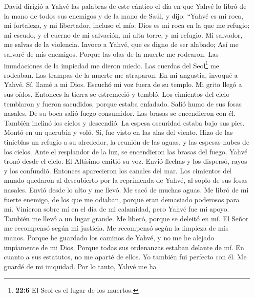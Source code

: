  David dirigió a Yahvé las palabras de este cántico el día
en que Yahvé lo libró de la mano de todos sus enemigos y de la mano de
Saúl,  y dijo: ``Yahvé es mi roca, mi fortaleza, y mi
libertador, incluso el mío;  Dios es mi roca en la que me
refugio; mi escudo, y el cuerno de mi salvación, mi alta torre, y mi
refugio. Mi salvador, me salvas de la violencia.  Invoco a
Yahvé, que es digno de ser alabado; Así me salvaré de mis enemigos.
 Porque las olas de la muerte me rodearon. Las
inundaciones de la impiedad me dieron miedo.  Las cuerdas
del Seol\footnote{\textbf{22:6} El Seol es el lugar de los muertos.} me
rodeaban. Las trampas de la muerte me atraparon.  En mi
angustia, invoqué a Yahvé. Sí, llamé a mi Dios. Escuchó mi voz fuera de
su templo. Mi grito llegó a sus oídos.  Entonces la tierra
se estremeció y tembló. Los cimientos del cielo temblaron y fueron
sacudidos, porque estaba enfadado.  Salió humo de sus
fosas nasales. De su boca salió fuego consumidor. Las brasas se
encendieron con él.  También inclinó los cielos y
descendió. La espesa oscuridad estaba bajo sus pies. 
Montó en un querubín y voló. Sí, fue visto en las alas del viento.
 Hizo de las tinieblas un refugio a su alrededor, la
reunión de las aguas, y las espesas nubes de los cielos. 
Ante el resplandor de la luz, se encendieron las brasas del fuego.
 Yahvé tronó desde el cielo. El Altísimo emitió su voz.
 Envió flechas y los dispersó, rayos y los confundió.
 Entonces aparecieron los canales del mar. Los cimientos
del mundo quedaron al descubierto por la reprimenda de Yahvé, al soplo
de sus fosas nasales.  Envió desde lo alto y me llevó. Me
sacó de muchas aguas.  Me libró de mi fuerte enemigo, de
los que me odiaban, porque eran demasiado poderosos para mí.
 Vinieron sobre mí en el día de mi calamidad, pero Yahvé
fue mi apoyo.  También me llevó a un lugar grande. Me
liberó, porque se deleitó en mí.  El Señor me recompensó
según mi justicia. Me recompensó según la limpieza de mis manos.
 Porque he guardado los caminos de Yahvé, y no me he
alejado impíamente de mi Dios.  Porque todas sus
ordenanzas estaban delante de mí. En cuanto a sus estatutos, no me
aparté de ellos.  Yo también fui perfecto con él. Me
guardé de mi iniquidad.  Por lo tanto, Yahvé me ha
